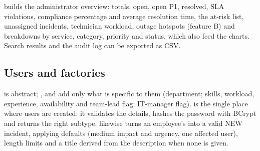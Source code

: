  builds the administrator overview: totals, open, open P1, resolved, SLA violations, compliance percentage and average resolution time, the at-risk list, unassigned incidents, technician workload, outage hotspots (feature B) and breakdowns by service, category, priority and status, which also feed the charts. Search results and the audit log can be exported as CSV.

\subsection{Users and factories}
 is abstract; ,  and  add only what is specific to them (department; skills, workload, experience, availability and team-lead flag; IT-manager flag).  is the single place where users are created: it validates the details, hashes the password with BCrypt and returns the right subtype.  likewise turns an employee's  into a valid NEW incident, applying defaults (medium impact and urgency, one affected user), length limits and a title derived from the description when none is given.

